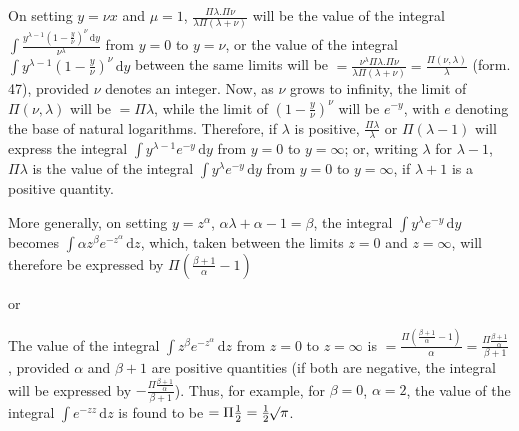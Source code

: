On setting $y=\nu x$ and $\mu=1$, $\frac{\Pi\lambda.\Pi\nu}{\lambda\Pi(\lambda+\nu)}$ will be the value of the integral $\int\frac{y^{\lambda-1}(1-\frac y\nu)^\nu\,\mathrm{d}y}{\nu^\lambda}$ from $y=0$ to $y=\nu$, or the value of the integral $\int y^{\lambda-1}(1-\frac y\nu)^\nu\,\mathrm{d}y$ between the same limits will be $=\frac{\nu^\lambda\Pi\lambda.\Pi\nu}{\lambda\Pi(\lambda+\nu)}
=\frac{\Pi(\nu,\lambda)}\lambda$ (form. 47), provided $\nu$ denotes an integer. Now, as $\nu$ grows to infinity, the limit of $\Pi(\nu,\lambda)$ will be $=\Pi\lambda$, while the limit of $(1-\frac y\nu)^\nu$ will be $e^{-y}$, with $e$ denoting the base of natural logarithms. Therefore, if $\lambda$ is positive, $\frac{\Pi\lambda}\lambda$ or $\Pi(\lambda-1)$ will express the integral $\int y^{\lambda-1}e^{-y}\,\mathrm{d}y$ from $y=0$ to $y=\infty$; or, writing $\lambda$ for $\lambda-1$, $\Pi\lambda$ is the value of the integral $\int y^\lambda e^{-y}\,\mathrm{d}y$ from $y=0$ to $y=\infty$, if $\lambda+1$ is a positive quantity.

More generally, on setting $y=z^\alpha$, $\alpha\lambda+\alpha-1=\beta$, the integral $\int y^\lambda e^{-y}\,\mathrm{d}y$ becomes $\int\alpha z^\beta e^{-z^\alpha}\,\mathrm{d}z$, which, taken between the limits $z=0$ and $z=\infty$, will therefore be expressed by $\Pi(\frac{\beta+1}\alpha-1)$

\noindent or

The value of the integral $\int z^\beta e^{-z^\alpha}\,\mathrm{d}z$ from $z=0$ to $z=\infty$ is $=\frac{\Pi(\frac{\beta+1}\alpha-1)}\alpha
=\frac{\Pi\frac{\beta+1}\alpha}{\beta+1}$, provided $\alpha$ and $\beta+1$ are positive quantities (if both are negative, the integral will be expressed by $-\frac{\Pi\frac{\beta+1}\alpha}{\beta+1}$). Thus, for example, for $\beta=0$, $\alpha=2$, the value of the integral $\int e^{-zz}\,\mathrm{d}z$ is found to be $=\Pi\frac12=\frac12\mathord{{}^{}\!\surd}\pi$.

